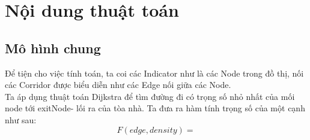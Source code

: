 \section{Nội dung thuật toán}
    \subsection{Mô hình chung}
    Để tiện cho việc tính toán, ta coi các Indicator như là các Node 
    trong đồ thị, nối các Corridor được biểu diễn như các Edge nối giữa
    các Node. \\ 
    Ta áp dụng thuật toán Dijkstra để tìm đường đi có trọng số nhỏ nhất 
    của mối node tới exitNode- lối ra của tòa nhà. Ta đưa ra hàm tính 
    trọng số của một cạnh như sau: 
    \begin{equation}
        F(edge, density) =   
    \end{equation}

